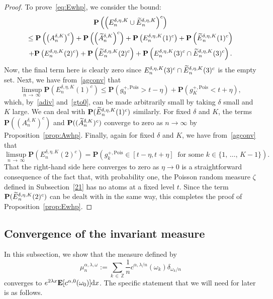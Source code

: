 \documentclass[AHL,Unicode,longabstracts,published]{cedram}
\newcommand{\Z}{\mathbb Z}
\newcommand{\bfP}{\mathbf{P}}
\newcommand{\bfE}{\mathbf{E}}
\newcommand{\dd}{\text{\upshape{d}}}
\newcommand{\Pois}{\text{Pois}}
\let\oldtilde\tilde
\renewcommand*{\tilde}[1]{\mathchoice{\widetilde{#1}}{\widetilde{#1}}{\oldtilde{#1}}{\oldtilde{#1}}}
\begin{document}
\begin{proof}
To prove~\eqref{eq:Ewhp}, we consider the bound:
\begin{multline*}
\bfP\left(\left({E}_n^{\delta,\eta,K}\cup \tilde{E}_n^{\delta,\eta,K}\right)^c\right)\\
\leq \bfP\left(\left({A}_n^{\delta,K}\right)^c\right) +\bfP\left(\left(\tilde{A}_n^{\delta,K}\right)^c\right) +\bfP\left({E}_n^{\delta,\eta,K}(1)^c\right) +\bfP\left(\tilde{E}_n^{\delta,\eta,K}(1)^c\right)\\
+\bfP\left({E}_n^{\delta,\eta,K}(2)^c\right) +\bfP\left(\tilde{E}_n^{\delta,\eta,K}(2)^c\right) +\bfP\left({E}_n^{\delta,\eta,K}(3)^c\cap\tilde{E}_n^{\delta,\eta,K}(3)^c\right).
\end{multline*}
Now, the final term here is clearly zero since ${E}_n^{\delta,\eta,K}(3)^c\cap\tilde{E}_n^{\delta,\eta,K}(3)^c$ is the empty set. Next, we have from~\eqref{agconv} that
\[
\limsup_{n\,\rightarrow\,\infty} \bfP\left({E}_n^{\delta,\eta,K}(1)^c\right)\leq\bfP\left(g_0^{+,\Pois}> t-\eta\right)+\bfP\left(g_K^{+,\Pois}< t+\eta\right),
\]
which, by~\eqref{adiv} and~\eqref{gto0}, can be made arbitrarily small by taking $\delta$ small and $K$ large. We can deal with $\bfP(\tilde{E}_n^{\delta,\eta,K}(1)^c)$ similarly. For fixed $\delta$ and $K$, the terms $\bfP(({A}_n^{\delta,K})^c)$ and $\bfP((\tilde{A}_n^{\delta,K})^c)$ converge to zero as $n\rightarrow\infty$ by Proposition~\ref{prop:Awhp}. Finally, again for fixed $\delta$ and $K$, we have from~\eqref{agconv} that
\[
\limsup_{n\,\rightarrow\,\infty} \bfP\left({E}_n^{\delta,\eta,K}(2)^c\right)=
\bfP\left(g_k^{+,\Pois}\in[t-\eta,t+\eta]\:\text{ for some }k\in\{1,\,\dots,\,K-1\}\right).
\]
That the right-hand side here converges to zero as $\eta\rightarrow 0$ is a straightforward consequence of the fact that, with probability one, the Poisson random measure $\zeta$ defined in Subsection~\ref{21} has no atoms at a fixed level $t$. Since the term $\bfP(\tilde{E}_n^{\delta,\eta,K}(2)^c)$ can be dealt with in the same way, this completes the proof of Proposition~\ref{prop:Ewhp}.
\end{proof}

\subsection{Convergence of the invariant measure}\label{23}

In this subsection, we show that the measure defined by
\begin{equation}\label{mundef}
\mu_n^{\alpha,\lambda,\omega}:=\sum_{k\,\in\,\Z}\frac{1}{n}c^{\alpha,\lambda/n}(\omega_k)\delta_{\omega_k/n}
\end{equation}
converges to $e^{2\lambda x}\bfE[c^{\alpha,0}(\omega_0)]\dd x$. The specific statement that we will need for later is as follows.
\end{document}
